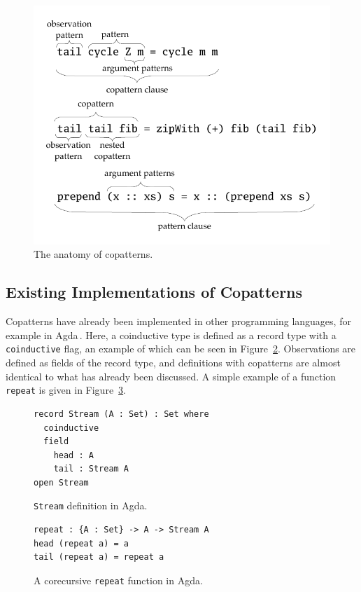 \begin{figure}[H]
\centering
  \includegraphics[scale=1]{figures/copattern_anatomy}
  \caption{The anatomy of copatterns.}
  \label{fig:copatterns_anatomy}
\end{figure}

\subsection{Existing Implementations of Copatterns}
Copatterns have already been implemented in other programming languages, for example in
Agda\,\cite{Norell:thesis}. Here, a coinductive type is defined as a record type with a
\texttt{coinductive} flag, an example of which can be seen in
Figure~\ref{fig:agda_stream}. Observations are defined as fields of the record
type, and definitions with copatterns are almost identical to what has already been
discussed. A simple example of a function \texttt{repeat} is given in Figure~\ref{fig:agda_repeat}. 
\begin{figure}[h]
\begin{lstlisting}[mathescape]
record Stream (A : Set) : Set where
  coinductive
  field
    head : A
    tail : Stream A
open Stream
\end{lstlisting}
\caption{\texttt{Stream} definition in Agda.}
\label{fig:agda_stream}
\end{figure}

\begin{figure}[h]
\begin{lstlisting}[mathescape]
repeat : {A : Set} -> A -> Stream A
head (repeat a) = a
tail (repeat a) = repeat a 
\end{lstlisting}
\caption{A corecursive \texttt{repeat} function in Agda.}
\label{fig:agda_repeat}
\end{figure}

